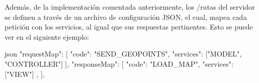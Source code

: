 Además, de la implementación comentada anteriormente, los /rutas del servidor se definen a través de un archivo de configuración JSON, el cual, mapea cada petición con los servicios, al igual que sus respuestas pertinentes. Esto se puede ver en el siguiente ejemplo:

\begin{code}{\scriptsize}{json}
{
  "requestMap": [
    {
      "code": "SEND_GEOPOINTS",
      "services": ["MODEL", "CONTROLLER"]
    }
  ],
  "responseMap": [
    {
      "code": "LOAD_MAP",
      "services": ["VIEW"]
    },
  ],
}
\end{code}
